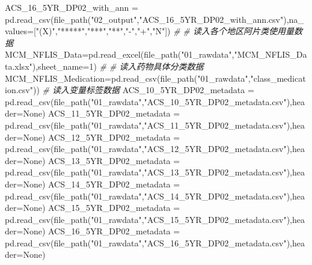 \documentclass[
]{article}
\newenvironment{Shaded}{}{}
\newcommand{\CommentTok}[1]{\textcolor[rgb]{0.38,0.63,0.69}{\textit{#1}}}
\newcommand{\DecValTok}[1]{\textcolor[rgb]{0.25,0.63,0.44}{#1}}
\newcommand{\NormalTok}[1]{#1}
\newcommand{\OperatorTok}[1]{\textcolor[rgb]{0.40,0.40,0.40}{#1}}
\newcommand{\StringTok}[1]{\textcolor[rgb]{0.25,0.44,0.63}{#1}}
\newcommand{\VariableTok}[1]{\textcolor[rgb]{0.10,0.09,0.49}{#1}}
\begin{document}
\begin{Shaded}
\begin{Highlighting}[]
\NormalTok{ACS\_16\_5YR\_DP02\_with\_ann }\OperatorTok{=}\NormalTok{ pd.read\_csv(file\_path(}\StringTok{"02\_output"}\NormalTok{,}\StringTok{"ACS\_16\_5YR\_DP02\_with\_ann.csv"}\NormalTok{),na\_values}\OperatorTok{=}\NormalTok{[}\StringTok{"(X)"}\NormalTok{,}\StringTok{"*****"}\NormalTok{,}\StringTok{"***"}\NormalTok{,}\StringTok{"**"}\NormalTok{,}\StringTok{"{-}"}\NormalTok{,}\StringTok{"+"}\NormalTok{,}\StringTok{"N"}\NormalTok{])}
\CommentTok{\# \# 读入各个地区阿片类使用量数据}
\NormalTok{MCM\_NFLIS\_Data}\OperatorTok{=}\NormalTok{pd.read\_excel(file\_path(}\StringTok{"01\_rawdata"}\NormalTok{,}\StringTok{"MCM\_NFLIS\_Data.xlsx"}\NormalTok{),sheet\_name}\OperatorTok{=}\DecValTok{1}\NormalTok{)}
\CommentTok{\# \# 读入药物具体分类数据}
\NormalTok{MCM\_NFLIS\_Medication}\OperatorTok{=}\NormalTok{pd.read\_csv(file\_path(}\StringTok{"01\_rawdata"}\NormalTok{,}\StringTok{"class\_medication.csv"}\NormalTok{))}
\CommentTok{\# 读入变量标签数据}
\NormalTok{ACS\_10\_5YR\_DP02\_metadata }\OperatorTok{=}\NormalTok{ pd.read\_csv(file\_path(}\StringTok{"01\_rawdata"}\NormalTok{,}\StringTok{"ACS\_10\_5YR\_DP02\_metadata.csv"}\NormalTok{),header}\OperatorTok{=}\VariableTok{None}\NormalTok{)}
\NormalTok{ACS\_11\_5YR\_DP02\_metadata }\OperatorTok{=}\NormalTok{ pd.read\_csv(file\_path(}\StringTok{"01\_rawdata"}\NormalTok{,}\StringTok{"ACS\_11\_5YR\_DP02\_metadata.csv"}\NormalTok{),header}\OperatorTok{=}\VariableTok{None}\NormalTok{)}
\NormalTok{ACS\_12\_5YR\_DP02\_metadata }\OperatorTok{=}\NormalTok{ pd.read\_csv(file\_path(}\StringTok{"01\_rawdata"}\NormalTok{,}\StringTok{"ACS\_12\_5YR\_DP02\_metadata.csv"}\NormalTok{),header}\OperatorTok{=}\VariableTok{None}\NormalTok{)}
\NormalTok{ACS\_13\_5YR\_DP02\_metadata }\OperatorTok{=}\NormalTok{ pd.read\_csv(file\_path(}\StringTok{"01\_rawdata"}\NormalTok{,}\StringTok{"ACS\_13\_5YR\_DP02\_metadata.csv"}\NormalTok{),header}\OperatorTok{=}\VariableTok{None}\NormalTok{)}
\NormalTok{ACS\_14\_5YR\_DP02\_metadata }\OperatorTok{=}\NormalTok{ pd.read\_csv(file\_path(}\StringTok{"01\_rawdata"}\NormalTok{,}\StringTok{"ACS\_14\_5YR\_DP02\_metadata.csv"}\NormalTok{),header}\OperatorTok{=}\VariableTok{None}\NormalTok{)}
\NormalTok{ACS\_15\_5YR\_DP02\_metadata }\OperatorTok{=}\NormalTok{ pd.read\_csv(file\_path(}\StringTok{"01\_rawdata"}\NormalTok{,}\StringTok{"ACS\_15\_5YR\_DP02\_metadata.csv"}\NormalTok{),header}\OperatorTok{=}\VariableTok{None}\NormalTok{)}
\NormalTok{ACS\_16\_5YR\_DP02\_metadata }\OperatorTok{=}\NormalTok{ pd.read\_csv(file\_path(}\StringTok{"01\_rawdata"}\NormalTok{,}\StringTok{"ACS\_16\_5YR\_DP02\_metadata.csv"}\NormalTok{),header}\OperatorTok{=}\VariableTok{None}\NormalTok{)}
\end{Highlighting}
\end{Shaded}
\end{document}
